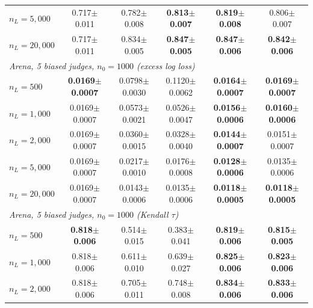 \begin{table}[!t]
{\begin{tabular}{lccccc}
\quad $n_L=5,000$ & 0.717{\scriptsize$\pm$0.011} & 0.782{\scriptsize$\pm$0.008} & \textbf{0.813{\scriptsize$\pm$0.007}} & \textbf{0.819{\scriptsize$\pm$0.008}} & 0.806{\scriptsize$\pm$0.007} \\
\quad $n_L=20,000$ & 0.717{\scriptsize$\pm$0.011} & 0.834{\scriptsize$\pm$0.005} & \textbf{0.847{\scriptsize$\pm$0.005}} & \textbf{0.847{\scriptsize$\pm$0.006}} & \textbf{0.842{\scriptsize$\pm$0.006}} \\
\midrule
\multicolumn{6}{l}{\emph{Arena, 5 biased judges, $n_0=1000$ (excess log loss)}} \\
\quad $n_L=500$ & \textbf{0.0169{\scriptsize$\pm$0.0007}} & 0.0798{\scriptsize$\pm$0.0030} & 0.1120{\scriptsize$\pm$0.0062} & \textbf{0.0164{\scriptsize$\pm$0.0007}} & \textbf{0.0169{\scriptsize$\pm$0.0007}} \\
\quad $n_L=1,000$ & 0.0169{\scriptsize$\pm$0.0007} & 0.0573{\scriptsize$\pm$0.0021} & 0.0526{\scriptsize$\pm$0.0047} & \textbf{0.0156{\scriptsize$\pm$0.0006}} & \textbf{0.0160{\scriptsize$\pm$0.0006}} \\
\quad $n_L=2,000$ & 0.0169{\scriptsize$\pm$0.0007} & 0.0360{\scriptsize$\pm$0.0015} & 0.0328{\scriptsize$\pm$0.0040} & \textbf{0.0144{\scriptsize$\pm$0.0007}} & 0.0151{\scriptsize$\pm$0.0007} \\
\quad $n_L=5,000$ & 0.0169{\scriptsize$\pm$0.0007} & 0.0217{\scriptsize$\pm$0.0010} & 0.0176{\scriptsize$\pm$0.0008} & \textbf{0.0128{\scriptsize$\pm$0.0006}} & 0.0135{\scriptsize$\pm$0.0006} \\
\quad $n_L=20,000$ & 0.0169{\scriptsize$\pm$0.0007} & 0.0143{\scriptsize$\pm$0.0006} & 0.0135{\scriptsize$\pm$0.0006} & \textbf{0.0118{\scriptsize$\pm$0.0005}} & \textbf{0.0118{\scriptsize$\pm$0.0005}} \\
\midrule
\multicolumn{6}{l}{\emph{Arena, 5 biased judges, $n_0=1000$ (Kendall $\tau$)}} \\
\quad $n_L=500$ & \textbf{0.818{\scriptsize$\pm$0.006}} & 0.514{\scriptsize$\pm$0.015} & 0.383{\scriptsize$\pm$0.041} & \textbf{0.819{\scriptsize$\pm$0.006}} & \textbf{0.815{\scriptsize$\pm$0.005}} \\
\quad $n_L=1,000$ & 0.818{\scriptsize$\pm$0.006} & 0.611{\scriptsize$\pm$0.010} & 0.639{\scriptsize$\pm$0.027} & \textbf{0.825{\scriptsize$\pm$0.006}} & \textbf{0.823{\scriptsize$\pm$0.006}} \\
\quad $n_L=2,000$ & 0.818{\scriptsize$\pm$0.006} & 0.705{\scriptsize$\pm$0.011} & 0.748{\scriptsize$\pm$0.008} & \textbf{0.834{\scriptsize$\pm$0.006}} & \textbf{0.833{\scriptsize$\pm$0.006}} \\

\end{tabular}}
\end{table}
